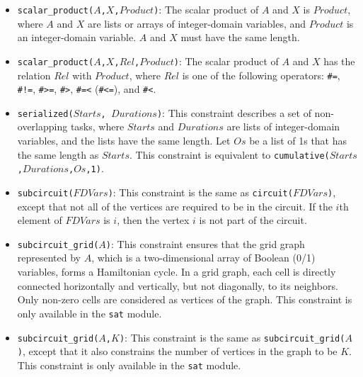 \begin{itemize}
\item \texttt{scalar\_product($A$,$X$,$Product$)}: The scalar product of $A$ and $X$ is $Product$, where $A$ and $X$ are lists or arrays of integer-domain variables, and $Product$ is an integer-domain variable. $A$ and $X$ must have the same length.

\item \texttt{scalar\_product($A$,$X$,$Rel$,$Product$)}: The scalar product of $A$ and $X$ has the relation $Rel$ with $Product$, where $Rel$ is one of the following operators: \verb+#=+, \verb+#!=+, \verb+#>=+, \verb+#>+, \verb+#=<+ (\verb+#<=+), and \verb+#<+. 

\item \texttt{serialized($Starts$, $Durations$)}: This constraint describes a set of non-overlapping tasks, where $Starts$ and $Durations$ are lists of integer-domain variables, and the lists have the same length. Let $Os$ be a list of 1s that has the same length as $Starts$. This constraint is equivalent to \texttt{cumulative($Starts$,$Durations$,$Os$,1)}.

\item \texttt{subcircuit($FDVars$)}: This constraint is the same as \texttt{circuit($FDVars$)}, except that not all of the vertices are required to be in the circuit. If the $i$th element of $FDVars$ is $i$, then the vertex $i$ is not part of the circuit. 

\item \texttt{subcircuit\_grid($A$)}: This constraint ensures that the grid graph represented by $A$, which is a two-dimensional array of Boolean (0/1) variables, forms a Hamiltonian cycle. In a grid graph, each cell is directly connected horizontally and vertically, but not diagonally, to its neighbors. Only non-zero cells are considered as vertices of the graph. This constraint is only available in the \texttt{sat} module.

\item \texttt{subcircuit\_grid($A$,$K$)}: This constraint is the same as \texttt{subcircuit\_grid($A$)}, except that it also constrains the number of vertices in the graph to be $K$. This constraint is only available in the \texttt{sat} module.

\end{itemize}

